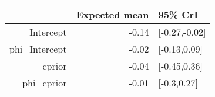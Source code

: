 \begin{tabular}{rrl}
  \hline
 & Expected mean & 95\% CrI \\ 
  \hline
Intercept & -0.14 & [-0.27,-0.02] \\ 
  phi\_Intercept & -0.02 & [-0.13,0.09] \\ 
  cprior & -0.04 & [-0.45,0.36] \\ 
  phi\_cprior & -0.01 & [-0.3,0.27] \\ 
   \hline
\end{tabular}

